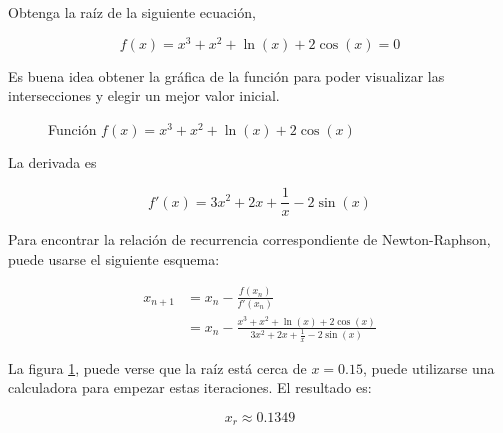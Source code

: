 \begin{ex}
    Obtenga la raíz de la siguiente ecuación,

    \[
        f(x) = x^3 + x^2 + \ln(x) + 2 \cos(x) = 0
    \]

    \begin{solution}

        Es buena idea obtener la gráfica de la función para poder visualizar
        las intersecciones y elegir un mejor valor inicial.

        \begin{figure}
            \centering
            \caption{Función $f(x) = x^3 + x^2 + \ln(x) + 2 \cos(x)$}
            \label{fig:ejercicio-newton}
        \end{figure}


        La derivada es 

        \[
            f'(x) = 3x^2 + 2x + \frac{1}{x} - 2 \sin(x)
        \]

        Para encontrar la relación de recurrencia correspondiente de
        Newton-Raphson, puede usarse el siguiente esquema:

        \begin{align*}
            x_{n+1} &= x_n - \frac{f(x_n)}{f'(x_n)} \\
                &= x_n - \frac{x^3 + x^2 + \ln(x) + 2
                \cos(x)}{3x^2 + 2x + \frac{1}{x} - 2 \sin(x)}
        \end{align*}

        La figura \ref{fig:ejercicio-newton}, puede verse que la raíz está
        cerca de $x = 0.15$, puede utilizarse una calculadora para empezar
        estas iteraciones. El resultado es:

        \[
            \boxed{x_r \approx 0.1349}
        \]

    \end{solution}

\end{ex}

